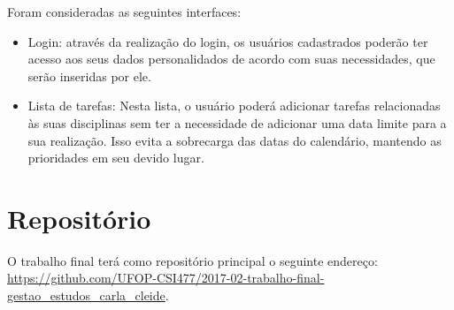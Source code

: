 \documentclass[10pt,a4paper,article]{abntex2}
\begin{document}
		  Foram consideradas as seguintes interfaces:
		  
		  \begin{itemize}
		      \item Login: através da realização do login, os usuários cadastrados poderão ter acesso aos seus dados personalidados de acordo com suas necessidades, que serão inseridas por ele.
		      
		      
		  
		      
		      \item Lista de tarefas: Nesta lista, o usuário poderá adicionar tarefas relacionadas às suas disciplinas sem ter a necessidade de adicionar uma data limite para a sua realização. Isso evita a sobrecarga das datas do calendário, mantendo as prioridades em seu devido lugar.
		  \end{itemize}

	\section{Repositório}

		O trabalho final terá como repositório principal o seguinte endereço: \url{https://github.com/UFOP-CSI477/2017-02-trabalho-final-gestao_estudos_carla_cleide}.
\end{document}
